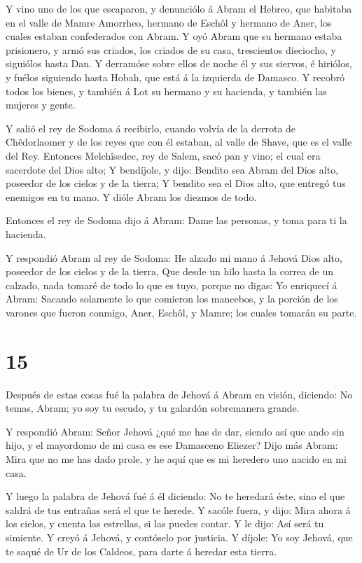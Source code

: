  Y vino uno de los que escaparon, y denunciólo á Abram el
Hebreo, que habitaba en el valle de Mamre Amorrheo, hermano de Eschôl y
hermano de Aner, los cuales estaban confederados con Abram.
 Y oyó Abram que su hermano estaba prisionero, y armó sus
criados, los criados de su casa, trescientos dieciocho, y siguiólos
hasta Dan.  Y derramóse sobre ellos de noche él y sus
siervos, é hiriólos, y fuélos siguiendo hasta Hobah, que está á la
izquierda de Damasco.  Y recobró todos los bienes, y
también á Lot su hermano y su hacienda, y también las mujeres y gente.

 Y salió el rey de Sodoma á recibirlo, cuando volvía de la
derrota de Chêdorlaomer y de los reyes que con él estaban, al valle de
Shave, que es el valle del Rey.  Entonces Melchîsedec, rey
de Salem, sacó pan y vino; el cual era sacerdote del Dios alto;
 Y bendíjole, y dijo: Bendito sea Abram del Dios alto,
poseedor de los cielos y de la tierra;  Y bendito sea el
Dios alto, que entregó tus enemigos en tu mano. Y dióle Abram los
diezmos de todo.

 Entonces el rey de Sodoma dijo á Abram: Dame las personas,
y toma para ti la hacienda.

 Y respondió Abram al rey de Sodoma: He alzado mi mano á
Jehová Dios alto, poseedor de los cielos y de la tierra, 
Que desde un hilo hasta la correa de un calzado, nada tomaré de todo lo
que es tuyo, porque no digas: Yo enriquecí á Abram: 
Sacando solamente lo que comieron los mancebos, y la porción de los
varones que fueron conmigo, Aner, Eschôl, y Mamre; los cuales tomarán su
parte.

\hypertarget{section-14}{%
\section{15}\label{section-14}}

 Después de estas cosas fué la palabra de Jehová á Abram en
visión, diciendo: No temas, Abram; yo soy tu escudo, y tu galardón
sobremanera grande.

 Y respondió Abram: Señor Jehová ¿qué me has de dar, siendo
así que ando sin hijo, y el mayordomo de mi casa es ese Damasceno
Eliezer?  Dijo más Abram: Mira que no me has dado prole, y
he aquí que es mi heredero uno nacido en mi casa.

 Y luego la palabra de Jehová fué á él diciendo: No te
heredará éste, sino el que saldrá de tus entrañas será el que te herede.
 Y sacóle fuera, y dijo: Mira ahora á los cielos, y cuenta
las estrellas, si las puedes contar. Y le dijo: Así será tu simiente.
 Y creyó á Jehová, y contóselo por justicia.  Y
díjole: Yo soy Jehová, que te saqué de Ur de los Caldeos, para darte á
heredar esta tierra.

